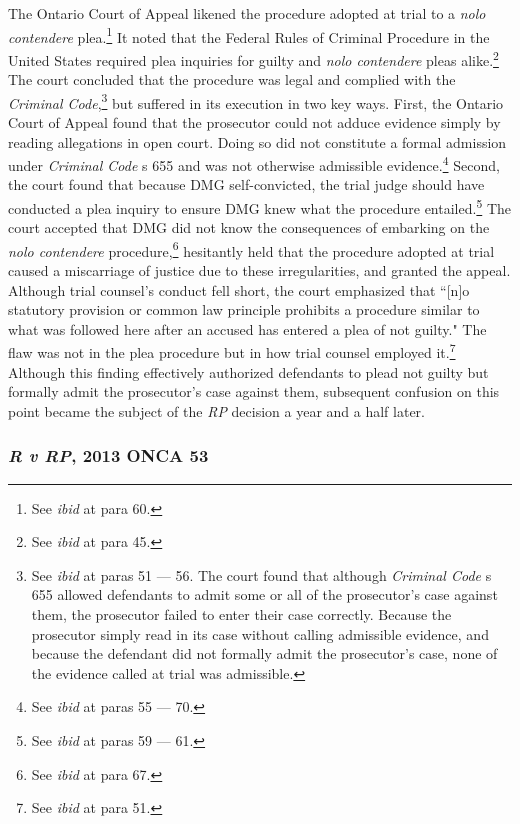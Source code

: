The Ontario Court of Appeal likened the procedure adopted at trial to a \textit{nolo contendere} plea.\footnote{See \textit{ibid} at para 60.} It noted that the Federal Rules of Criminal Procedure in the United States required plea inquiries for guilty and \textit{nolo contendere} pleas alike.\footnote{See \textit{ibid} at para 45.} The court concluded that the procedure was legal and complied with the \textit{Criminal Code},\footnote{See \textit{ibid} at paras 51 — 56. The court found that although \textit{Criminal Code} s 655 allowed defendants to admit some or all of the prosecutor's case against them, the prosecutor failed to enter their case correctly. Because the prosecutor simply read in its case without calling admissible evidence, and because the defendant did not formally admit the prosecutor's case, none of the evidence called at trial was admissible.} but suffered in its execution in two key ways. First, the Ontario Court of Appeal found that the prosecutor could not adduce evidence simply by reading allegations in open court. Doing so did not constitute a formal admission under \textit{Criminal Code} s 655 and was not otherwise admissible evidence.\footnote{See \textit{ibid} at paras 55 — 70.} Second, the court found that because DMG self-convicted, the trial judge should have conducted a plea inquiry to ensure DMG knew what the procedure entailed.\footnote{See \textit{ibid} at paras 59 — 61.} The court accepted that DMG did not know the consequences of embarking on the \textit{nolo contendere} procedure,\footnote{See \textit{ibid} at para 67.} hesitantly held that the procedure adopted at trial caused a miscarriage of justice due to these irregularities, and granted the appeal. Although trial counsel's conduct fell short, the court emphasized that ``[n]o statutory provision or common law principle prohibits a procedure similar to what was followed here after an accused has entered a plea of not guilty." The flaw was not in the plea procedure but in how trial counsel employed it.\footnote{See \textit{ibid} at para 51.} Although this finding effectively authorized defendants to plead not guilty but formally admit the prosecutor's case against them, subsequent confusion on this point became the subject of the \textit{RP} decision a year and a half later.

\subsubsection{\textit{R v RP}, 2013 ONCA 53}

